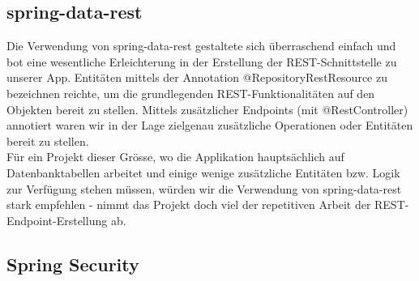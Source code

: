 \documentclass[11pt]{article} %
\begin{document}
\subsection{spring-data-rest}
Die Verwendung von spring-data-rest gestaltete sich überraschend einfach und bot eine wesentliche Erleichterung in der Erstellung der REST-Schnittstelle zu unserer App. Entitäten mittels der Annotation @RepositoryRestResource zu bezeichnen reichte, um die grundlegenden REST-Funktionalitäten auf den Objekten bereit zu stellen. Mittels zusätzlicher Endpoints (mit @RestController) annotiert waren wir in der Lage zielgenau zusätzliche Operationen oder Entitäten bereit zu stellen.
\\
Für ein Projekt dieser Grösse, wo die Applikation hauptsächlich auf Datenbanktabellen arbeitet und einige wenige zusätzliche Entitäten bzw. Logik zur Verfügung stehen müssen, würden wir die Verwendung von spring-data-rest stark empfehlen - nimmt das Projekt doch viel der repetitiven Arbeit der REST-Endpoint-Erstellung ab.

\subsection{Spring Security}
\end{document}
